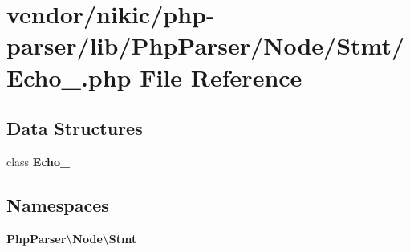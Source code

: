 \section{vendor/nikic/php-\/parser/lib/\+Php\+Parser/\+Node/\+Stmt/\+Echo\+\_\+.php File Reference}
\label{_echo___8php}
\subsection*{Data Structures}
\begin{DoxyCompactItemize}
\item 
class {\bf Echo\+\_\+}
\end{DoxyCompactItemize}
\subsection*{Namespaces}
\begin{DoxyCompactItemize}
\item 
 {\bf Php\+Parser\textbackslash{}\+Node\textbackslash{}\+Stmt}
\end{DoxyCompactItemize}

